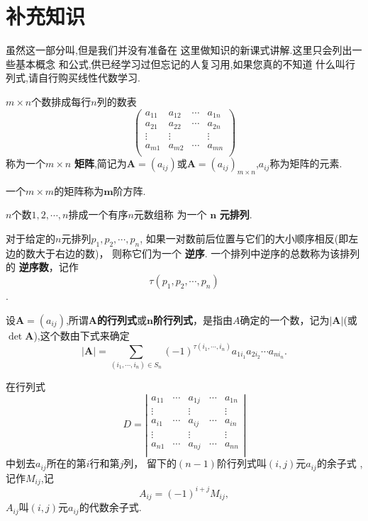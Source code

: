 \section{补充知识}

虽然这一部分叫,但是我们并没有准备在
这里做知识的新课式讲解.这里只会列出一些基本概念
和公式,供已经学习过但忘记的人复习用,如果您真的不知道
什么叫行列式,请自行购买线性代数学习.

 $m\times n$个数排成每行$n$列的数表
$$\left(
  \begin{array}{cccc}
    a_{11} & a_{12} & \cdots & a_{1n} \\
    a_{21} & a_{22} & \cdots & a_{2n} \\
    \vdots & \vdots &  & \vdots \\
    a_{m1} & a_{m2} & \cdots & a_{mn} \\
  \end{array}
\right)$$
称为一个$m\times n$ \textbf{矩阵},简记为$\bm{A}=(a_{ij})$或$\bm{A}=(a_{ij})_{m\times n}$,$a_{ij}$称为矩阵的元素.

 一个$m\times m$的矩阵称为$\bm{m}$阶方阵.

 $n$个数$1,2,\cdots,n$排成一个有序$n$元数组称
为一个 $\bm{n}$ \textbf{元排列}.

 对于给定的$n$元排列$p_1,p_2,\cdots,p_n$,
如果一对数前后位置与它们的大小顺序相反(即左边的数大于右边的数)，
则称它们为一个 \textbf{逆序}.
一个排列中逆序的总数称为该排列的 \textbf{逆序数}，记作$$\tau(p_1,p_2,\cdots,p_n)$$.

 设$\bm{A}=(a_{ij})$,所谓$\bm{A}$\textbf{的行列式}或$\bm{n}$\textbf{阶行列式}，是指由$A$确定的一个数，记为$\left | \bm{A} \right |$(或$\det \bm{A}$),这个数由下式来确定
$$
\left | \bm{A} \right |=\sum_{(i_1,\cdots,i_n)\in S_n}{(-1)^{\tau(i_1,\cdots,i_n)}a_{1i_1}a_{2i_2}\cdots a_{ni_n}}
.$$

 在行列式
$$
D=
\left|
  \begin{array}{ccccc}
    a_{11} & \cdots & a_{1j} & \cdots & a_{1n} \\
    \vdots &  & \vdots &  & \vdots \\
    a_{i1} & \cdots & a_{ij} & \cdots & a_{in} \\
    \vdots &  & \vdots &  & \vdots \\
    a_{n1} & \cdots & a_{nj} & \cdots & a_{nn} \\
  \end{array}
\right|
$$
中划去$a_{ij}$所在的第$i$行和第$j$列，
留下的$(n-1)$阶行列式叫$(i,j)$元$a_{ij}$的余子式
,记作$M_{ij}$,记$$A_{ij}=(-1)^{i+j}M_{ij},$$
$A_{ij}$叫$(i,j)$元$a_{ij}$的代数余子式.

